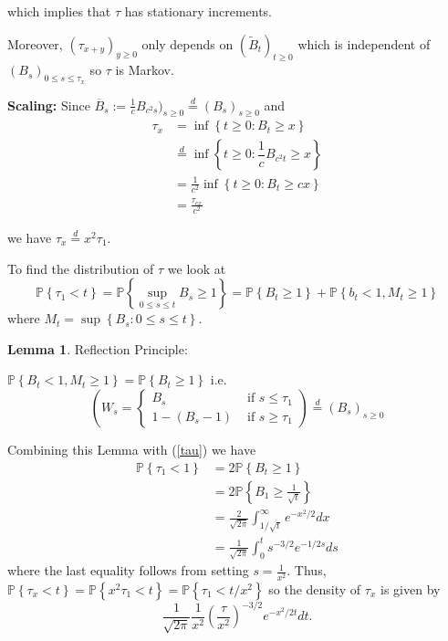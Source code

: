 \documentclass{article}
\renewcommand{\P}{\mathbb{P}}  %
\theoremstyle{definition}
\newtheorem{lemma}[thm]{Lemma}
\begin{document}
	which implies that $\tau$ has stationary increments.
	
	Moreover, 
	$(\tau_{x + y})_{y \geq 0}$
	only depends on $(\tilde{B}_t)_{t \geq 0 }$
	which is independent of $(B_s)_{0 \leq s \leq \tau_x}$
	so $\tau$ is Markov.
	
	\textbf{Scaling:}
	Since $\overline{B}_s := \frac{1}{c} B_{c^2s})_{s \geq 0} \stackrel{d}{=}(B_s)_{s \geq 0}$
	and 
	$$
	\begin{aligned}
	\tau_x 
	& = \inf \left\lbrace t \geq 0 : B_t \geq x \right\rbrace \\
	& \stackrel{d}{=} \inf \left\lbrace t \geq 0 : \dfrac{1}{c} B_{c^2t} \geq x \right\rbrace  \\
	& = \frac{1}{c^2} \inf \left\lbrace t \geq 0 : B_t \geq c x \right\rbrace \\
	& = \frac{\tau_{c x}}{c^2}
	\end{aligned}
	$$
	
	we have 
	$\tau_x \stackrel{d}{=} x^2\tau_1.$
	
	To find the distribution of $\tau$ we look at
	\begin{equation}
	\P \left\lbrace \tau_1 < t \right\rbrace 
	= \P \left\lbrace \sup_{0 \leq s \leq t} B_s \geq 1 \right\rbrace
	= \P \left\lbrace B_t \geq 1 \right\rbrace + \P \left\lbrace b_t < 1, M_t \geq 1 \right\rbrace \label{tau}
	\end{equation}
	where 
	$M_t 
	= \sup \left\lbrace B_s : 0 \leq s \leq t \right\rbrace.$
	
	\begin{lemma}Reflection Principle:
		
		$\P \left\lbrace B_t < 1, M_t \geq 1 \right\rbrace 
		= \P \left\lbrace B_t \geq 1 \right\rbrace$
		i.e. 
		$$
		\left( W_s = \left\lbrace\begin{array}{cc}
		B_s 		& \text{ if } s \leq \tau_1 \\
		1-(B_s-1) 	& \text{ if } s \geq \tau_1
		\end{array}
		\right.
		\right)
		\stackrel{d}{=} (B_s)_{ s \geq 0 }
		$$
	\end{lemma}
	
	Combining this Lemma with (\ref{tau}) we have
	$$
	\begin{aligned}
	\P \left\lbrace \tau_1 < 1 \right\rbrace 
	& = 2 \P \left\lbrace B_t \geq 1 \right\rbrace 					\\
	& = 2 \P \left\lbrace B_1 \geq \frac{1}{\sqrt{t}} \right\rbrace	\\
	& = \frac{2}{\sqrt{2\pi}}\int_{1/\sqrt{t}}^{\infty} e^{-x^2/2} dx 	\\
	& = \frac{1}{\sqrt{2 \pi}} \int_{0}^{t} s^{-3/2} e^{-1/2s} ds
	\end{aligned}
	$$
	where the last equality follows from setting $s=\frac{1}{x^2}.$
	Thus,
	$\P \left\lbrace \tau_x < t \right\rbrace 
	= \P \left\lbrace x^2\tau_1 < t \right\rbrace 
	= \P \left\lbrace \tau_1 < t/x^2 \right\rbrace 
	$
	so the density of $\tau_x$ is given by
	$$
	\frac{1}{\sqrt{2 \pi}}\frac{1}{x^2} \left(\frac{\tau}{x^2}\right)^{-3/2} e^{-x^2/2t} dt.
	$$
	
\end{document}
